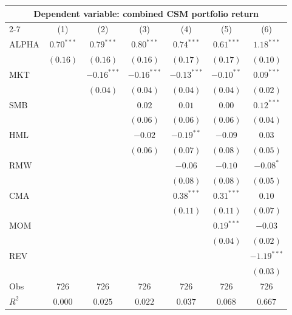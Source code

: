 \begin{tabular}{lcccccc}
  \hline \multicolumn{7}{c}{Dependent variable: combined CSM portfolio return} \\
 \cmidrule(l){2-7} \vspace{5pt}  & (1) & (2) & (3) & (4) & (5) & (6) \\ 
  ALPHA & $0.70^{***}$ & $0.79^{***}$ & $0.80^{***}$ & $0.74^{***}$ & $0.61^{***}$ & $1.18^{***}$ \\ 
   & $(0.16)$ & $(0.16)$ & $(0.16)$ & $(0.17)$ & $(0.17)$ & $(0.10)$ \\ 
  MKT &  & $-0.16^{***}$ & $-0.16^{***}$ & $-0.13^{***}$ & $-0.10^{**}$ & $0.09^{***}$ \\ 
   &  & $(0.04)$ & $(0.04)$ & $(0.04)$ & $(0.04)$ & $(0.02)$ \\ 
  SMB &  &  & $0.02$ & $0.01$ & $0.00$ & $0.12^{***}$ \\ 
   &  &  & $(0.06)$ & $(0.06)$ & $(0.06)$ & $(0.04)$ \\ 
  HML &  &  & $-0.02$ & $-0.19^{**}$ & $-0.09$ & $0.03$ \\ 
   &  &  & $(0.06)$ & $(0.07)$ & $(0.08)$ & $(0.05)$ \\ 
  RMW &  &  &  & $-0.06$ & $-0.10$ & $-0.08^{*}$ \\ 
   &  &  &  & $(0.08)$ & $(0.08)$ & $(0.05)$ \\ 
  CMA &  &  &  & $0.38^{***}$ & $0.31^{***}$ & $0.10$ \\ 
   &  &  &  & $(0.11)$ & $(0.11)$ & $(0.07)$ \\ 
  MOM &  &  &  &  & $0.19^{***}$ & $-0.03$ \\ 
   &  &  &  &  & $(0.04)$ & $(0.02)$ \\ 
  REV &  &  &  &  &  & $-1.19^{***}$ \\ 
   \vspace{5pt} &  &  &  &  &  & $(0.03)$ \\ 
  Obs & 726 & 726 & 726 & 726 & 726 & 726 \\ 
  $R^2$ & $0.000$ & $0.025$ & $0.022$ & $0.037$ & $0.068$ & $0.667$ \\ 
   \bottomrule\end{tabular}
